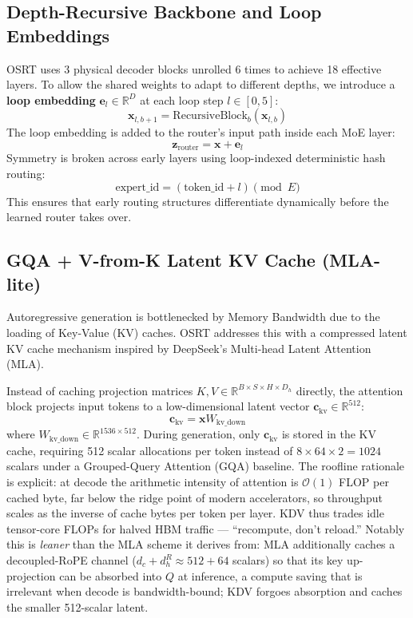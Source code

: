 \documentclass[11pt,twocolumn]{article}
\begin{document}
\subsection{Depth-Recursive Backbone and Loop Embeddings}
\label{sec:variable-loops}
OSRT uses 3 physical decoder blocks unrolled 6 times to achieve 18 effective layers. To allow the shared weights to adapt to different depths, we introduce a \textbf{loop embedding} $\mathbf{e}_l \in \mathbb{R}^{D}$ at each loop step $l \in [0, 5]$:
\begin{equation}
\mathbf{x}_{l, b+1} = \text{RecursiveBlock}_b(\mathbf{x}_{l, b})
\end{equation}
The loop embedding is added to the router's input path inside each MoE layer:
\begin{equation}
\mathbf{z}_{\text{router}} = \mathbf{x} + \mathbf{e}_l
\end{equation}
Symmetry is broken across early layers using loop-indexed deterministic hash routing:
\begin{equation}
\text{expert\_id} = (\text{token\_id} + l) \pmod E
\end{equation}
This ensures that early routing structures differentiate dynamically before the learned router takes over.

\subsection{GQA + V-from-K Latent KV Cache (MLA-lite)}
Autoregressive generation is bottlenecked by Memory Bandwidth due to the loading of Key-Value (KV) caches. OSRT addresses this with a compressed latent KV cache mechanism inspired by DeepSeek's Multi-head Latent Attention (MLA).

Instead of caching projection matrices $K, V \in \mathbb{R}^{B \times S \times H \times D_h}$ directly, the attention block projects input tokens to a low-dimensional latent vector $\mathbf{c}_{\text{kv}} \in \mathbb{R}^{512}$:
\begin{equation}
\mathbf{c}_{\text{kv}} = \mathbf{x} W_{\text{kv\_down}}
\end{equation}
where $W_{\text{kv\_down}} \in \mathbb{R}^{1536 \times 512}$. During generation, only $\mathbf{c}_{\text{kv}}$ is stored in the KV cache, requiring 512 scalar allocations per token instead of $8 \times 64 \times 2 = 1024$ scalars under a Grouped-Query Attention (GQA) baseline. The roofline rationale is explicit: at decode the arithmetic intensity of attention is $\mathcal{O}(1)$ FLOP per cached byte, far below the ridge point of modern accelerators, so throughput scales as the inverse of cache bytes per token per layer. KDV thus trades idle tensor-core FLOPs for halved HBM traffic --- ``recompute, don't reload.'' Notably this is \emph{leaner} than the MLA scheme it derives from: MLA additionally caches a decoupled-RoPE channel ($d_c + d_h^R \approx 512 + 64$ scalars) so that its key up-projection can be absorbed into $Q$ at inference, a compute saving that is irrelevant when decode is bandwidth-bound; KDV forgoes absorption and caches the smaller 512-scalar latent.
\end{document}
